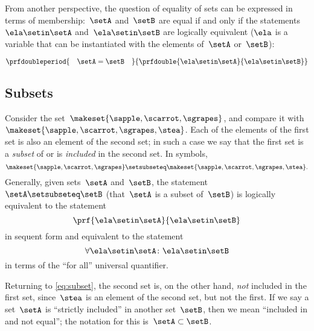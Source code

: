 From another perspective, the question of equality of sets can be expressed in terms of membership:~$\setA$ and~$\setB$ are equal if and only if the statements~$\ela \setin\setA$ and~$\ela \setin\setB$ are logically equivalent ($\ela$ is a variable that can be instantiated with the elements of~$\setA$ or~$\setB$):

\begin{equation}
    \prfdoubleperiod{
        \quad \setA = \setB \quad
    }{
        \prfdouble{
            \ela \setin\setA
        }{
            \ela \setin\setB
        }
    }
\end{equation}


\subsection{Subsets}

Consider the set~$\makeset{ \sapple, \scarrot, \sgrapes }$, and compare it with~$\makeset{ \sapple, \scarrot, \sgrapes, \stea }$.
Each of the elements of the first set is also an element of the second set;
in such a case we say that the first set is a \emph{subset} of or is \emph{included} in the second set.
In symbols,
%
\begin{equation}
    \label{eq:subset}
    \makeset{ \sapple, \scarrot, \sgrapes } \setsubseteq \makeset{ \sapple, \scarrot, \sgrapes, \stea }.
\end{equation}
%
Generally, given sets~$\setA$ and~$\setB$, the statement~$\setA \setsubseteq \setB$ (that~$\setA$ is a subset of~$\setB$) is logically equivalent to the statement
%
\begin{equation}
    \prf{
        \ela \setin\setA
    }{
        \ela \setin\setB
    }
\end{equation}
in sequent form and equivalent to the statement
\begin{equation}
    \label{eq:inclusion-via-quantifier}
    \forall \ela \setin\setA \colon \ela \setin\setB
\end{equation}
in terms of the ``for all'' universal quantifier.

Returning to \cref{eq:subset}, the second set is, on the other hand, \emph{not} included in the first set, since~$\stea$ is an element of the second set, but not the first.
If we say a set~$\setA$ is ``strictly included'' in another set~$\setB$, then we mean ``included in and not equal''; the notation for this is~$\setA \subset \setB$.

